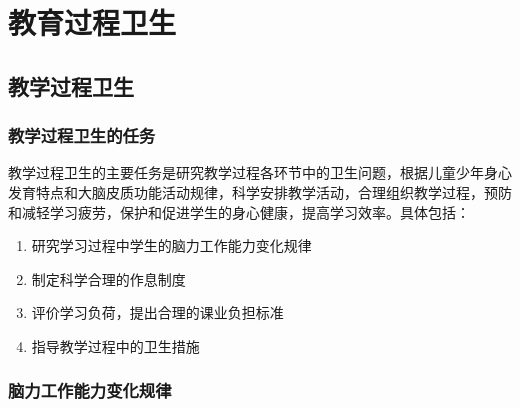 \chapter{教育过程卫生}
\setcounter{chapter}{15}

\section{教学过程卫生}

\subsection{教学过程卫生的任务}

\begin{defbox}
教学过程卫生的主要任务是研究教学过程各环节中的卫生问题，根据儿童少年身心发育特点和大脑皮质功能活动规律，科学安排教学活动，合理组织教学过程，预防和减轻学习疲劳，保护和促进学生的身心健康，提高学习效率。具体包括：

\begin{enumerate}[leftmargin=*]
    \item 研究学习过程中学生的脑力工作能力变化规律
    \item 制定科学合理的作息制度
    \item 评价学习负荷，提出合理的课业负担标准
    \item 指导教学过程中的卫生措施
\end{enumerate}
\end{defbox}

\subsection{脑力工作能力变化规律}


